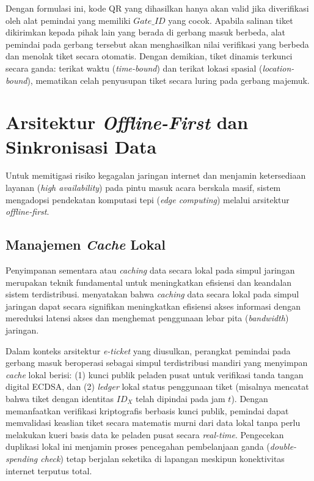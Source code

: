 Dengan formulasi ini, kode QR yang dihasilkan hanya akan valid jika diverifikasi oleh alat pemindai yang memiliki $Gate\_ID$ yang cocok. Apabila salinan tiket dikirimkan kepada pihak lain yang berada di gerbang masuk berbeda, alat pemindai pada gerbang tersebut akan menghasilkan nilai verifikasi yang berbeda dan menolak tiket secara otomatis. Dengan demikian, tiket dinamis terkunci secara ganda: terikat waktu (\textit{time-bound}) dan terikat lokasi spasial (\textit{location-bound}), mematikan celah penyusupan tiket secara luring pada gerbang majemuk.

\section{Arsitektur \textit{Offline-First} dan Sinkronisasi Data}
\label{sec:offline_architecture}

Untuk memitigasi risiko kegagalan jaringan internet dan menjamin ketersediaan layanan (\textit{high availability}) pada pintu masuk acara berskala masif, sistem mengadopsi pendekatan komputasi tepi (\textit{edge computing}) melalui arsitektur \textit{offline-first}.

\subsection{Manajemen \textit{Cache} Lokal}
Penyimpanan sementara atau \textit{caching} data secara lokal pada simpul jaringan merupakan teknik fundamental untuk meningkatkan efisiensi dan keandalan sistem terdistribusi. \textcite{tang2006benefit} menyatakan bahwa \textit{caching} data secara lokal pada simpul jaringan dapat secara signifikan meningkatkan efisiensi akses informasi dengan mereduksi latensi akses dan menghemat penggunaan lebar pita (\textit{bandwidth}) jaringan. 

Dalam konteks arsitektur \textit{e-ticket} yang diusulkan, perangkat pemindai pada gerbang masuk beroperasi sebagai simpul terdistribusi mandiri yang menyimpan \textit{cache} lokal berisi: (1) kunci publik peladen pusat untuk verifikasi tanda tangan digital ECDSA, dan (2) \textit{ledger} lokal status penggunaan tiket (misalnya mencatat bahwa tiket dengan identitas $ID_X$ telah dipindai pada jam $t$). Dengan memanfaatkan verifikasi kriptografis berbasis kunci publik, pemindai dapat memvalidasi keaslian tiket secara matematis murni dari data lokal tanpa perlu melakukan kueri basis data ke peladen pusat secara \textit{real-time}. Pengecekan duplikasi lokal ini menjamin proses pencegahan pembelanjaan ganda (\textit{double-spending check}) tetap berjalan seketika di lapangan meskipun konektivitas internet terputus total.


